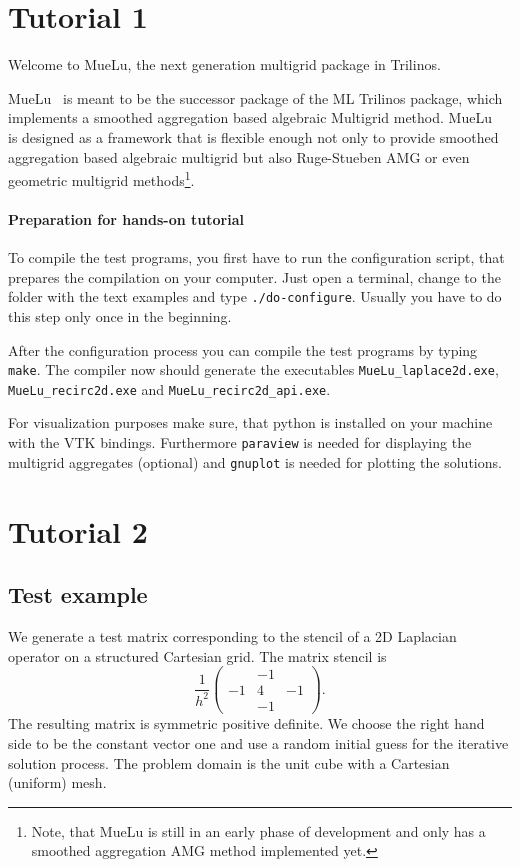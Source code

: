\documentclass[12pt,a4paper]{article}
\author{Tobias Wiesner}
\newcommand{\MueLu}{MueLu}
\begin{document}
\section{Tutorial 1}
Welcome to \MueLu, the next generation multigrid package in Trilinos.

\MueLu~ is meant to be the successor package of the ML Trilinos package, which implements a smoothed aggregation based algebraic Multigrid method. \MueLu~ is designed as a framework that is flexible enough not only to provide smoothed aggregation based algebraic multigrid but also Ruge-Stueben AMG or even geometric multigrid methods\footnote{Note, that MueLu is still in an early phase of development and only has a smoothed aggregation AMG method implemented yet.}.


\paragraph{Preparation for hands-on tutorial}
To compile the test programs, you first have to run the configuration script, that prepares the compilation on your computer. Just open a terminal, change to the folder with the text examples and type \verb|./do-configure|. Usually you have to do this step only once in the beginning.

After the configuration process you can compile the test programs by typing \verb|make|. The compiler now should generate the executables \verb|MueLu_laplace2d.exe|, \verb|MueLu_recirc2d.exe| and \verb|MueLu_recirc2d_api.exe|. 

For visualization purposes make sure, that python is installed on your machine with the VTK bindings. Furthermore \verb|paraview| is needed for displaying the multigrid aggregates (optional) and \verb|gnuplot| is needed for plotting the solutions.

\section{Tutorial 2}

\subsection{Test example}
We generate a test matrix corresponding to the stencil of a 2D Laplacian operator on a structured Cartesian grid. The matrix stencil is
\begin{displaymath}
\frac{1}{h^2}\begin{pmatrix} & -1 & \\ -1 & 4 & -1 \\ & -1 & \end{pmatrix}.
\end{displaymath}
The resulting matrix is symmetric positive definite. We choose the right hand side to be the constant vector one and use a random initial guess for the iterative solution process. The problem domain is the unit cube with a Cartesian (uniform) mesh.
\end{document}
